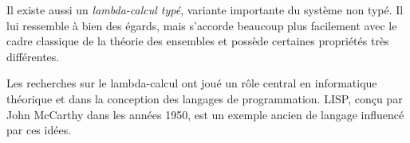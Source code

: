 \documentclass[../../../include/open-logic-section]{subfiles}
\begin{document}
\begin{digress}
Il existe aussi un \emph{lambda-calcul typé}, variante
importante du système non typé. Il lui ressemble à
bien des égards, mais s'accorde beaucoup plus
facilement avec le cadre classique de la théorie
des ensembles et possède certaines propriétés
très différentes.

Les recherches sur le lambda-calcul ont joué un
rôle central en informatique théorique et dans
la conception des langages de programmation.
LISP, conçu par John McCarthy dans les années
1950, est un exemple ancien de langage influencé
par ces idées.
\end{digress}
\end{document}
